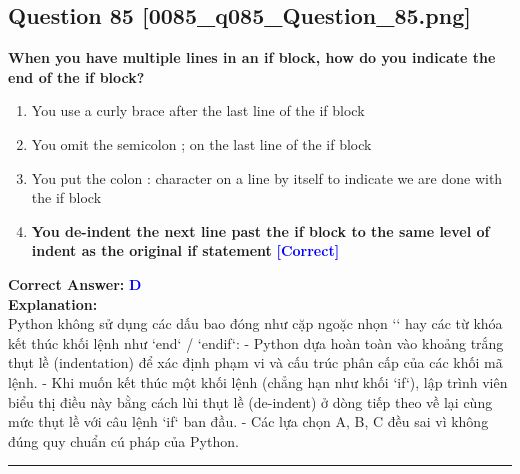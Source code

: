 \documentclass[11pt,a4paper]{article}
\begin{document}
\begin{minipage}{\textwidth}
\subsection*{Question 85 \quad \footnotesize{[0085_q085_Question_85.png]}}
\noindent \textbf{When you have multiple lines in an if block, how do you indicate the end of the if block?}

\begin{enumerate}[label=\Alph*.]
    \item You use a curly brace  after the last line of the if block
    \item You omit the semicolon ; on the last line of the if block
    \item You put the colon : character on a line by itself to indicate we are done with the if block
    \item \textbf{You de-indent the next line past the if block to the same level of indent as the original if statement} \hfill \textcolor{blue}{\textbf{[Correct]}}
\end{enumerate}

\noindent \textbf{Correct Answer:} \textcolor{blue}{\textbf{D}} \\[4pt]
\noindent \textbf{Explanation:}\\
Python không sử dụng các dấu bao đóng như cặp ngoặc nhọn `{}` hay các từ khóa kết thúc khối lệnh như `end` / `endif`:\newline
- Python dựa hoàn toàn vào khoảng trắng thụt lề (indentation) để xác định phạm vi và cấu trúc phân cấp của các khối mã lệnh.\newline
- Khi muốn kết thúc một khối lệnh (chẳng hạn như khối `if`), lập trình viên biểu thị điều này bằng cách lùi thụt lề (de-indent) ở dòng tiếp theo về lại cùng mức thụt lề với câu lệnh `if` ban đầu.\newline
- Các lựa chọn A, B, C đều sai vì không đúng quy chuẩn cú pháp của Python.
\end{minipage}
\vspace{0.8cm}
\hrule
\vspace{0.5cm}
\end{document}

